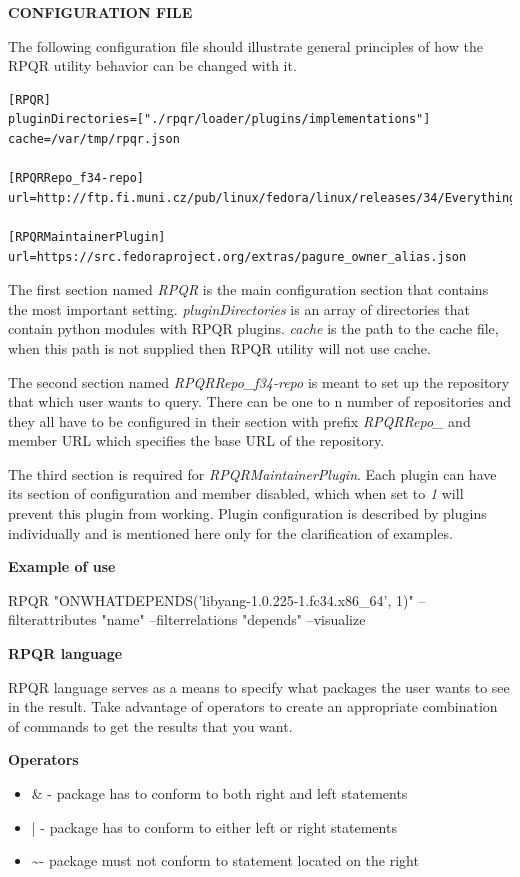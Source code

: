 \textbf{CONFIGURATION FILE}

The following configuration file should illustrate general principles of how the RPQR utility behavior
can be changed with it.

\begin{lstlisting}
[RPQR]
pluginDirectories=["./rpqr/loader/plugins/implementations"]
cache=/var/tmp/rpqr.json

[RPQRRepo_f34-repo]
url=http://ftp.fi.muni.cz/pub/linux/fedora/linux/releases/34/Everything/x86_64/os/

[RPQRMaintainerPlugin]
url=https://src.fedoraproject.org/extras/pagure_owner_alias.json
\end{lstlisting}

The first section named \textit{RPQR} is the main configuration section that contains the most important
setting. \textit{pluginDirectories} is an array of directories that contain python modules with RPQR
plugins. \textit{cache} is the path to the cache file, when this path is not supplied then RPQR utility
will not use cache.

The second section named \textit{RPQRRepo\_f34-repo} is meant to set up the repository that which user wants to
query. There can be one to n number of repositories and they all have to be configured in their 
section with prefix \textit{RPQRRepo\_} and member URL which specifies the base URL of the repository.

The third section is required for \textit{RPQRMaintainerPlugin}. Each plugin can have its section
of configuration and member disabled, which when set to \textit{1} will prevent this plugin from
working. Plugin configuration is described by plugins individually and is mentioned here only for
the clarification of examples.

\textbf{Example of use}

RPQR "ONWHATDEPENDS('libyang-1.0.225-1.fc34.x86\_64', 1)" --filterattributes "name" --filterrelations "depends" --visualize

\textbf{RPQR language}

RPQR language serves as a means to specify what packages the user wants to see in the result. Take advantage
of operators to create an appropriate combination of commands to get the results that you want.

\textbf{Operators}

\begin{itemize}
  \item \& - package has to conform to both right and left statements
  \item  | - package has to conform to either left or right statements
  \item  \textasciitilde - package must not conform to statement located on the right 
\end{itemize}

